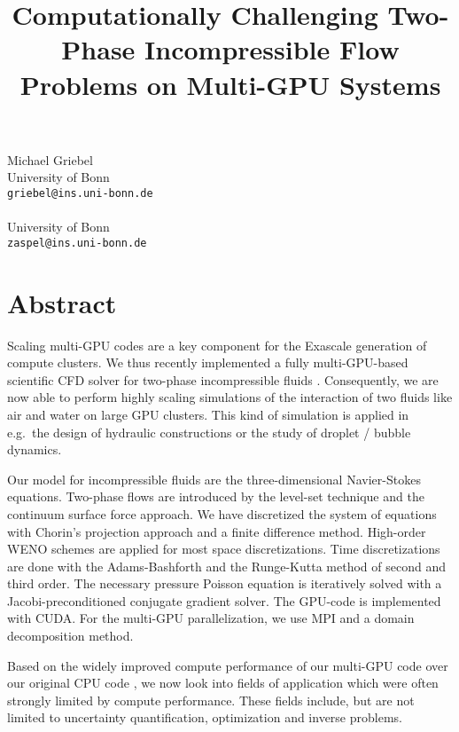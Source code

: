 \title{Computationally Challenging Two-Phase Incompressible Flow Problems on Multi-GPU Systems}
 \author{} \institute{}
\maketitle
\begin{center}
{\large Michael Griebel}\\
University of Bonn\\
{\tt griebel@ins.uni-bonn.de}
\\ \\
University of Bonn\\
{\tt zaspel@ins.uni-bonn.de}

\end{center}

\section*{Abstract}

Scaling multi-GPU codes are a key component for the Exascale generation of
compute clusters. We thus recently implemented a fully multi-GPU-based scientific
CFD solver for two-phase incompressible fluids
\cite{Griebel2010,Zaspel2011submitted}. Consequently, we are now able to perform
highly scaling simulations of the interaction of two fluids like air and water on
large GPU clusters. This kind of simulation is applied in e.g.~the design of
hydraulic constructions or the study of droplet / bubble dynamics.

Our model for incompressible fluids are the three-dimensional
Navier-Stokes equations. Two-phase flows are introduced by the
level-set technique and the continuum surface force approach. We have discretized the system of equations
with Chorin's projection approach and a finite difference method. High-order WENO
schemes are applied for most space discretizations. Time discretizations are done
with the Adams-Bashforth and the Runge-Kutta method of second and third order.
The necessary pressure Poisson equation is iteratively solved with a
Jacobi-preconditioned conjugate gradient solver. The GPU-code is implemented with
CUDA. For the multi-GPU parallelization, we use MPI and a domain decomposition
method.

Based on the widely improved compute performance of our multi-GPU code over our
original CPU code \cite{Croce2009}, we now look into fields of application which
were often strongly limited by compute performance. These fields include, but are not limited to uncertainty
quantification, optimization and inverse problems. 

